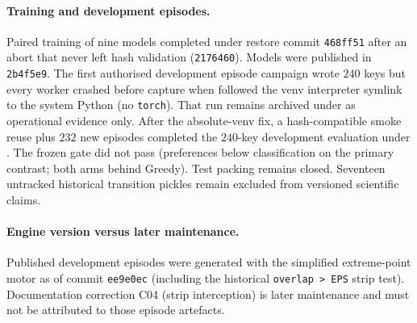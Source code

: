 \paragraph{Training and development episodes.}
Paired training of nine models completed under restore commit \texttt{468ff51}
after an abort that never left hash validation (\texttt{2176460}). Models were
published in \texttt{2b4f5e9}. The first authorised development episode campaign
wrote $240$ keys but every worker crashed before capture when
 followed the venv interpreter symlink to the system
Python (no \texttt{torch}). That run remains archived under
 as operational evidence only.
After the absolute-venv fix, a hash-compatible smoke reuse plus $232$ new
episodes completed the $240$-key development evaluation under
. The frozen gate did not pass
(preferences below classification on the primary contrast; both arms behind
Greedy). Test packing remains closed. Seventeen untracked historical transition pickles remain
excluded from versioned scientific claims.

\paragraph{Engine version versus later maintenance.}
Published development episodes were generated with the simplified extreme-point
motor as of commit \texttt{ee9e0ec} (including the historical
\texttt{overlap > EPS} strip test). Documentation correction C04 (strip
interception) is later maintenance and must not be attributed to those episode
artefacts.

